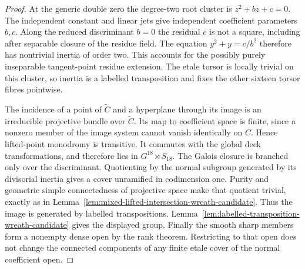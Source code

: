 \begin{proof}
At the generic double zero the degree-two root cluster is
$z^2+bz+c=0$. The independent constant and linear jets give
independent coefficient parameters $b,c$. Along the reduced
discriminant $b=0$ the residual $c$ is not a square, including
after separable closure of the residue field. The equation
$y^2+y=c/b^2$ therefore has nontrivial inertia of order two.
This accounts for the possibly purely inseparable tangent-point
residue extension. The etale torsor is locally trivial on this
cluster, so inertia is a labelled transposition and fixes the
other sixteen torsor fibres pointwise.

The incidence of a point of $\widetilde C$ and a hyperplane
through its image is an irreducible projective bundle over
$\widetilde C$. Its map to coefficient space is finite, since a
nonzero member of the image system cannot vanish identically
on $C$. Hence lifted-point monodromy is transitive. It commutes
with the global deck transformations, and therefore lies in
$G^{18}\rtimes S_{18}$. The Galois closure is branched only over
the discriminant. Quotienting by the normal subgroup generated
by its divisorial inertia gives a cover unramified in codimension
one. Purity \cite{Stacks0BMB} and geometric simple connectedness
of projective space make that quotient trivial, exactly as in
Lemma~\ref{lem:mixed-lifted-intersection-wreath-candidate}.
Thus the image is generated by labelled transpositions.
Lemma~\ref{lem:labelled-transposition-wreath-candidate} gives
the displayed group. Finally the smooth sharp members form a
nonempty dense open by the rank theorem. Restricting to that open
does not change the connected components of any finite etale
cover of the normal coefficient open.
\end{proof}

